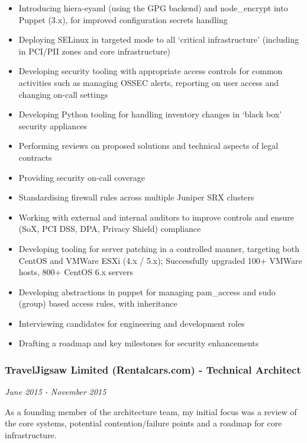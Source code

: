 \begin{itemize}
\tightlist
\item
  Introducing hiera-eyaml (using the GPG backend) and node\_encrypt into
  Puppet (3.x), for improved configuration secrets handling
\item
  Deploying SELinux in targeted mode to all `critical infrastructure'
  (including in PCI/PII zones and core infrastructure)
\item
  Developing security tooling with appropriate access controls for
  common activities such as managing OSSEC alerts, reporting on user
  access and changing on-call settings
\item
  Developing Python tooling for handling inventory changes in `black
  box' security appliances
\item
  Performing reviews on proposed solutions and technical aspects of
  legal contracts
\item
  Providing security on-call coverage
\item
  Standardising firewall rules across multiple Juniper SRX clusters
\item
  Working with external and internal auditors to improve controls and
  ensure (SoX, PCI DSS, DPA, Privacy Shield) compliance
\item
  Developing tooling for server patching in a controlled manner,
  targeting both CentOS and VMWare ESXi (4.x / 5.x); Successfully
  upgraded 100+ VMWare hosts, 800+ CentOS 6.x servers
\item
  Developing abstractions in puppet for managing pam\_access and sudo
  (group) based access rules, with inheritance
\item
  Interviewing candidates for engineering and development roles
\item
  Drafting a roadmap and key milestones for security enhancements
\end{itemize}

\subsubsection{TravelJigsaw Limited (Rentalcars.com) - Technical
Architect}\label{traveljigsaw-limited-rentalcars.com---technical-architect}

\emph{June 2015 - November 2015}

As a founding member of the architecture team, my initial focus was a
review of the core systems, potential contention/failure points and a
roadmap for core infrastructure.

